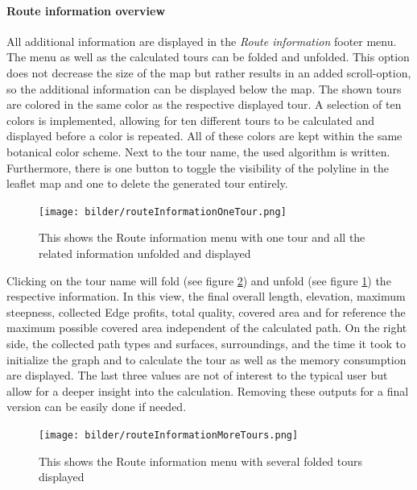 \paragraph{Route information overview}

All additional information are displayed in the \textit{Route information} footer menu. 
The menu as well as the calculated tours can be folded and unfolded.
This option does not decrease the size of the map but rather results in an added scroll-option, so the additional information can be displayed below the map.
The shown tours are colored in the same color as the respective displayed tour. 
A selection of ten colors is implemented, allowing for ten different tours to be calculated and displayed before a color is repeated. 
All of these colors are kept within the same botanical color scheme.
Next to the tour name, the used algorithm is written.
Furthermore, there is one button to toggle the visibility of the polyline in the leaflet map and one to delete the generated tour entirely.

\begin{figure}[H]
	\centering
	\texttt{[image: bilder/routeInformationOneTour.png]}
	\caption{This shows the Route information menu with one tour and all the related information unfolded and displayed}
	\label{fig:actualFrontendToureInfoMenuOneTour}
\end{figure}

Clicking on the tour name will fold (see figure \ref{fig:actualFrontendToureInfoMenuMoreTours}) and unfold (see figure \ref{fig:actualFrontendToureInfoMenuOneTour}) the respective information.
In this view, the final overall length, elevation, maximum steepness, collected Edge profits, total quality, covered area and for reference the maximum possible covered area independent of the calculated path.
On the right side, the collected path types and surfaces, surroundings, and the time it took to initialize the graph and to calculate the tour as well as the memory consumption are displayed.
The last three values are not of interest to the typical user but allow for a deeper insight into the calculation. 
Removing these outputs for a final version can be easily done if needed. 



\begin{figure}[H]
	\centering
	\texttt{[image: bilder/routeInformationMoreTours.png]}
	\caption{This shows the Route information menu with several folded tours displayed}
	\label{fig:actualFrontendToureInfoMenuMoreTours}
\end{figure}




